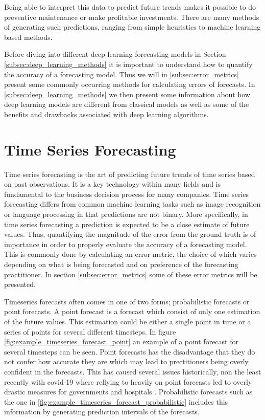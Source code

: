 Being able to interpret this data to predict future trends makes it possible to do preventive maintenance or make profitable investments. There are many methods of generating such predictions, ranging from simple heuristics to machine learning based methods. 


Before diving into different deep learning forecasting models in Section \ref{subsec:deep_learning_methods} it is important to understand how to quantify the accuracy of a forecasting model. Thus we will in \ref{subsec:error_metrics} present some commonly occurring methods for calculating errors of forecasts. In \ref{subsec:deep_learning_methods} we then present some information about how deep learning models are different from classical models as well as some of the benefits and drawbacks associated with deep learning algorithms.


\section{Time Series Forecasting}
\label{sec_time_series_forecasting}
Time series forecasting is the art of predicting future trends of time series based on past observations. It is a key technology within many fields and is fundamental to the business decision process for many companies. Time series forecasting differs from common machine learning tasks such as image recognition or language processing in that predictions are not binary. More specifically, in time series forecasting a prediction is expected to be a close estimate of future values. Thus, quantifying the magnitude of the error from the ground truth is of importance in order to properly evaluate the accuracy of a forecasting model. This is commonly done by calculating an error metric, the choice of which varies depending on what is being forecasted and on preference of the forecasting practitioner. In section \ref{subsec:error_metrics} some of these error metrics will be presented.

Timeseries forecasts often comes in one of two forms; probabilistic forecasts or point forecasts. A point forecast is a forecast which consist of only one estimation of the future values. This estimation could be either a single point in time or a series of points for several different timesteps. In figure \ref{fig:example_timeseries_forecast_point} an example of a point forecast for several timesteps can be seen. Point forecasts has the disadvantage that they do not confer how accurate they are which may lead to prectitioners being overly confident in the forecasts. This has caused several issues historically, non the least recently with covid-19 where rellying to heavily on point forecasts led to overly drastic measures for governments and hospitals \cite{IOANNIDIS2020}. Probabilistic forecasts such as the one in \ref{fig:example_timeseries_forecast_probabilistic} includes this information by generating prediction intervals of the forecasts.

